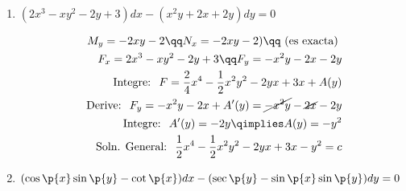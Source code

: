 \begin{enumerate}
    \item $\displaystyle (2x^3-xy^2-2y+3)dx-(x^2y+2x+2y)dy=0$
        \begin{center}
           \begin{align*}
               M_y = -2xy-2 \qq N_x = -2xy-2) \qq \text{ (es exacta) } \\ 
               F_x = 2x^3-xy^2-2y+3 \qq F_y=-x^2y-2x-2y \\ 
               \text{ Integre: }\; F=\frac{2}{4}x^4-\frac{1}{2}x^2y^2-2yx+3x +A(y) \\ 
                \text{ Derive: }\; F_y = -x^2y-2x+A'(y)=\cancel{-x^2y}-\cancel{2x}-2y \\ 
                \text{ Integre: }\; A'(y) = -2y \qimplies A(y)=-y^2 \\ 
                \text{ Soln. General: }\; \frac{1}{2}x^4 -\frac{1}{2}x^2y^2-2yx+3x-y^2=c \\ 
           \end{align*}
        \end{center}
    
    \item $\displaystyle (\cos\p{ x } \sin\p{ y } -\cot\p{ x } )dx - (\sec\p{ y } -\sin\p{ x } \sin\p{ y } )dy=0$ 
\end{enumerate}

